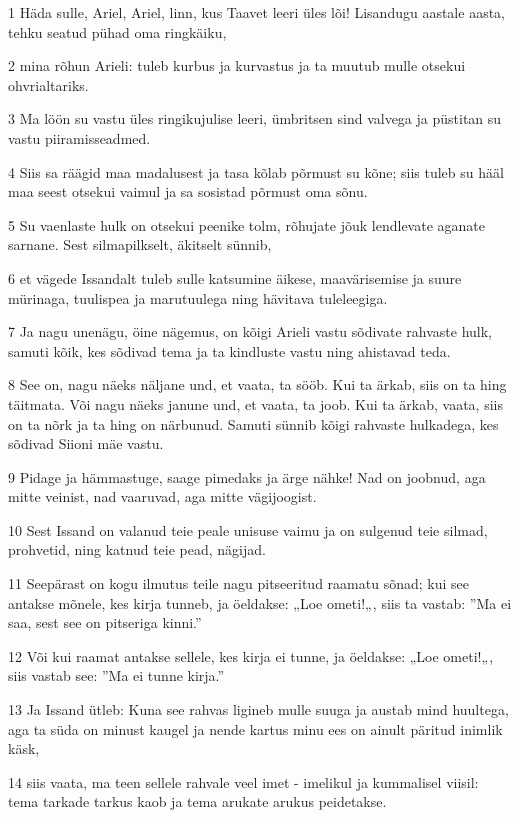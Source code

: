 \par 1 Häda sulle, Ariel, Ariel, linn, kus Taavet leeri üles lõi! Lisandugu aastale aasta, tehku seatud pühad oma ringkäiku,
\par 2 mina rõhun Arieli: tuleb kurbus ja kurvastus ja ta muutub mulle otsekui ohvrialtariks.
\par 3 Ma löön su vastu üles ringikujulise leeri, ümbritsen sind valvega ja püstitan su vastu piiramisseadmed.
\par 4 Siis sa räägid maa madalusest ja tasa kõlab põrmust su kõne; siis tuleb su hääl maa seest otsekui vaimul ja sa sosistad põrmust oma sõnu.
\par 5 Su vaenlaste hulk on otsekui peenike tolm, rõhujate jõuk lendlevate aganate sarnane. Sest silmapilkselt, äkitselt sünnib,
\par 6 et vägede Issandalt tuleb sulle katsumine äikese, maavärisemise ja suure mürinaga, tuulispea ja marutuulega ning hävitava tuleleegiga.
\par 7 Ja nagu unenägu, öine nägemus, on kõigi Arieli vastu sõdivate rahvaste hulk, samuti kõik, kes sõdivad tema ja ta kindluste vastu ning ahistavad teda.
\par 8 See on, nagu näeks näljane und, et vaata, ta sööb. Kui ta ärkab, siis on ta hing täitmata. Või nagu näeks janune und, et vaata, ta joob. Kui ta ärkab, vaata, siis on ta nõrk ja ta hing on närbunud. Samuti sünnib kõigi rahvaste hulkadega, kes sõdivad Siioni mäe vastu.
\par 9 Pidage ja hämmastuge, saage pimedaks ja ärge nähke! Nad on joobnud, aga mitte veinist, nad vaaruvad, aga mitte vägijoogist.
\par 10 Sest Issand on valanud teie peale unisuse vaimu ja on sulgenud teie silmad, prohvetid, ning katnud teie pead, nägijad.
\par 11 Seepärast on kogu ilmutus teile nagu pitseeritud raamatu sõnad; kui see antakse mõnele, kes kirja tunneb, ja öeldakse: „Loe ometi!„, siis ta vastab: ”Ma ei saa, sest see on pitseriga kinni.”
\par 12 Või kui raamat antakse sellele, kes kirja ei tunne, ja öeldakse: „Loe ometi!„, siis vastab see: ”Ma ei tunne kirja.”
\par 13 Ja Issand ütleb: Kuna see rahvas ligineb mulle suuga ja austab mind huultega, aga ta süda on minust kaugel ja nende kartus minu ees on ainult päritud inimlik käsk,
\par 14 siis vaata, ma teen sellele rahvale veel imet - imelikul ja kummalisel viisil: tema tarkade tarkus kaob ja tema arukate arukus peidetakse.
